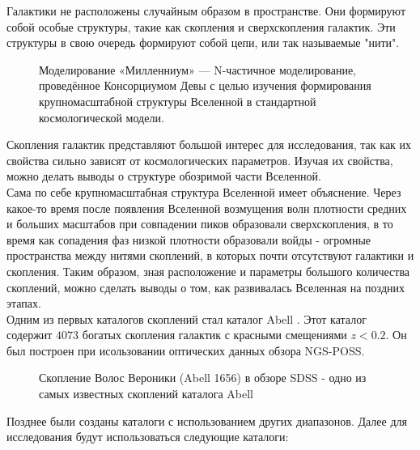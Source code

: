 \Introduction

Галактики не расположены случайным образом в пространстве. Они формируют собой особые структуры, 
такие как скопления и сверхскопления галактик. Эти структуры в свою очередь формируют собой цепи, 
или так называемые "нити".\\

\begin{figure}
    \caption{Моделирование «Милленниум» — N-частичное моделирование, проведённое Консорциумом 
        Девы с целью изучения формирования крупномасштабной структуры Вселенной в стандартной
        космологической модели.}
\end{figure}

Скопления галактик представляют большой интерес для исследования, так как их свойства сильно зависят 
от космологических параметров. Изучая их свойства, можно делать выводы о структуре обозримой части 
Вселенной.\\

Сама по себе крупномасштабная структура Вселенной имеет объяснение. Через какое-то время после 
появления Вселенной возмущения волн плотности средних и больших масштабов при совпадении пиков 
образовали сверхскопления, в то время как сопадения фаз низкой плотности образовали войды - 
огромные пространства между нитями скоплений, в которых почти отсутствуют галактики и скопления. 
Таким образом, зная расположение и параметры большого количества скоплений, можно сделать выводы о 
том, как развивалась Вселенная на поздних этапах.\\

Одним из первых каталогов скоплений стал каталог Abell \cite{Abell}. Этот каталог содержит $4073$ 
богатых скопления галактик с красными смещениями $z < 0.2$. Он был построен при исользовании 
оптических данных обзора NGS-POSS.\\

\begin{figure}
    \caption{Скопление Волос Вероники (Abell 1656) в обзоре SDSS - одно из самых известных 
        скоплений каталога Abell}
\end{figure}

Позднее были созданы каталоги с использованием других диапазонов. Далее для исследования будут 
использоваться следующие каталоги:\\

